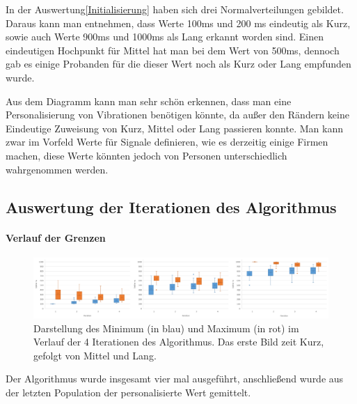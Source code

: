 In der Auswertung\ref{Initialisierung} haben sich drei Normalverteilungen gebildet. Daraus kann man entnehmen, dass Werte 100ms und  200 ms eindeutig als Kurz, sowie auch Werte 900ms und 1000ms als Lang erkannt worden sind. Einen eindeutigen Hochpunkt f{\"u}r Mittel hat man bei dem Wert von 500ms, dennoch gab es einige Probanden f{\"u}r die dieser Wert noch als Kurz oder Lang empfunden wurde. 

Aus dem Diagramm kann man sehr sch{\"o}n erkennen, dass man eine Personalisierung von Vibrationen ben{\"o}tigen k{\"o}nnte, da au{\ss}er den R{\"a}ndern keine Eindeutige Zuweisung von Kurz, Mittel oder Lang passieren konnte. Man kann zwar im Vorfeld Werte f{\"u}r Signale definieren, wie es derzeitig einige Firmen machen, diese Werte k{\"o}nnten jedoch von Personen unterschiedlich wahrgenommen werden.

\subsection{Auswertung der Iterationen des Algorithmus}


\paragraph{Verlauf der Grenzen}

\begin{figure}[htbp] 
	   \centering
   	\includegraphics[width=\textwidth]{pics/analyse/algo/MinMax/MinMaxFinal.png}
	\caption{Darstellung des Minimum (in blau) und Maximum (in rot) im Verlauf der 4 Iterationen des Algorithmus. Das erste Bild zeit Kurz, gefolgt von Mittel und Lang.}
	\label{fig:MinMaxSignale}
\end{figure}

Der Algorithmus wurde insgesamt vier mal ausgef{\"u}hrt, anschlie{\ss}end wurde aus der letzten Population der personalisierte Wert gemittelt. 

